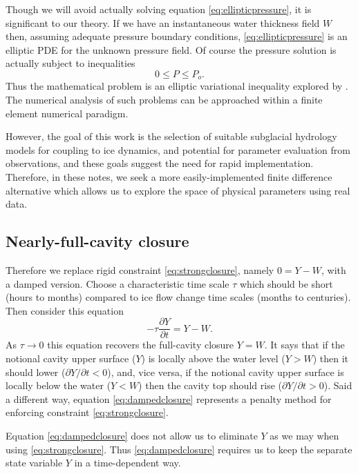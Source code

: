 \documentclass[12pt,final]{amsart}%
\begin{document}
Though we will avoid actually solving equation \eqref{eq:ellipticpressure}, it is significant to our theory.  If we have an instantaneous water thickness field $W$ then, assuming adequate pressure boundary conditions, \eqref{eq:ellipticpressure} is an elliptic PDE for the unknown pressure field.  Of course the pressure solution is actually subject to inequalities
\begin{equation}
0 \le P \le P_o. \label{eq:bounds}
\end{equation}
Thus the mathematical problem is an elliptic variational inequality explored by \cite{Schoofetal2012}.  The numerical analysis of such problems can be approached within a finite element \citep{SchoofStream,JouvetBueler2012} numerical paradigm.

However, the goal of this work is the selection of suitable subglacial hydrology models for coupling to ice dynamics, and potential for parameter evaluation from observations, and these goals suggest the need for rapid implementation.  Therefore, in these notes, we seek a more easily-implemented finite difference alternative which allows us to explore the space of physical parameters using real data.

\subsection*{Nearly-full-cavity closure}  Therefore we replace rigid constraint \eqref{eq:strongclosure}, namely $0 = Y - W$, with a damped version.  Choose a characteristic time scale $\tau$ which should be short (hours to months) compared to ice flow change time scales (months to centuries).  Then consider this equation
\begin{equation}
- \tau \frac{\partial Y}{\partial t} = Y - W. \label{eq:dampedclosure}
\end{equation}
As $\tau \to 0$ this equation recovers the full-cavity closure $Y=W$.  It says that if the notional cavity upper surface ($Y$) is locally above the water level ($Y>W$) then it should lower ($\partial Y/\partial t < 0$), and, vice versa, if the notional cavity upper surface is locally below the water ($Y<W$) then the cavity top should rise ($\partial Y/\partial t > 0$).   Said a different way, equation \eqref{eq:dampedclosure} represents a penalty method for enforcing constraint \eqref{eq:strongclosure}.

Equation \eqref{eq:dampedclosure} does not allow us to eliminate $Y$ as we may when using \eqref{eq:strongclosure}.  Thus \eqref{eq:dampedclosure} requires us to keep the separate state variable $Y$ in a time-dependent way.
\end{document}
